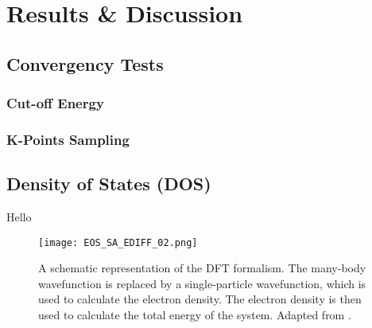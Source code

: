 \chapter{Results \& Discussion}
\label{Chapter4}

\section{Convergency Tests}
\subsection{Cut-off Energy}
\subsection{K-Points Sampling}
\section{Density of States (DOS)}



Hello
\begin{figure}[H]
    \centering
    \texttt{[image: EOS\_SA\_EDIFF\_02.png]}
    \caption{A schematic representation of the DFT formalism. The many-body wavefunction is replaced by a single-particle wavefunction, which is used to calculate the electron density. The electron density is then used to calculate the total energy of the system. Adapted from \supercite{giustino2014materials}.}
    \label{fig:dft}
\end{figure}
